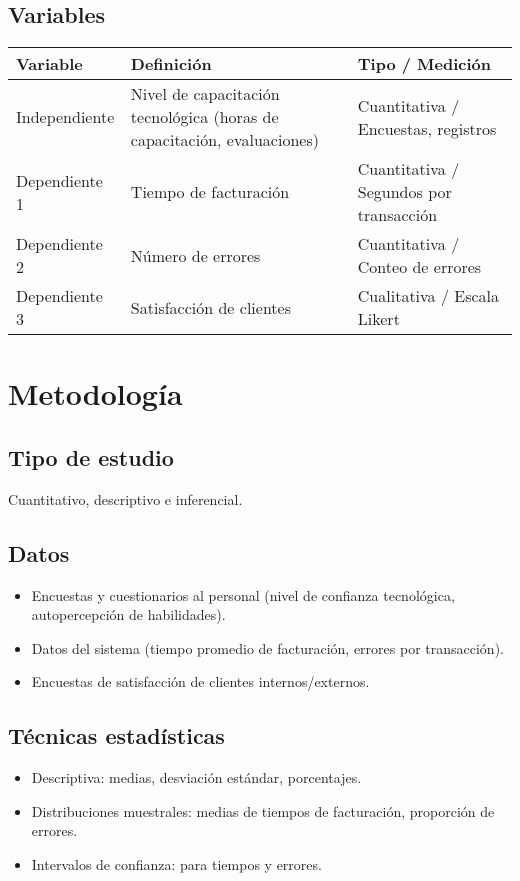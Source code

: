 \documentclass[12pt,a4paper]{report}
\begin{document}
\section*{Variables}
\begin{longtable}{p{4cm}p{5cm}p{4cm}}
\toprule
\textbf{Variable} & \textbf{Definición} & \textbf{Tipo / Medición} \\
\midrule
Independiente & Nivel de capacitación tecnológica (horas de capacitación, evaluaciones) & Cuantitativa / Encuestas, registros \\
Dependiente 1 & Tiempo de facturación & Cuantitativa / Segundos por transacción \\
Dependiente 2 & Número de errores & Cuantitativa / Conteo de errores \\
Dependiente 3 & Satisfacción de clientes & Cualitativa / Escala Likert \\
\bottomrule
\end{longtable}

\chapter{Metodología}

\section*{Tipo de estudio}
Cuantitativo, descriptivo e inferencial.

\section*{Datos}
\begin{itemize}
    \item Encuestas y cuestionarios al personal (nivel de confianza tecnológica, autopercepción de habilidades).
    \item Datos del sistema (tiempo promedio de facturación, errores por transacción).
    \item Encuestas de satisfacción de clientes internos/externos.
\end{itemize}

\section*{Técnicas estadísticas}
\begin{itemize}
    \item Descriptiva: medias, desviación estándar, porcentajes.
    \item Distribuciones muestrales: medias de tiempos de facturación, proporción de errores.
    \item Intervalos de confianza: para tiempos y errores.
\end{itemize}
\end{document}
